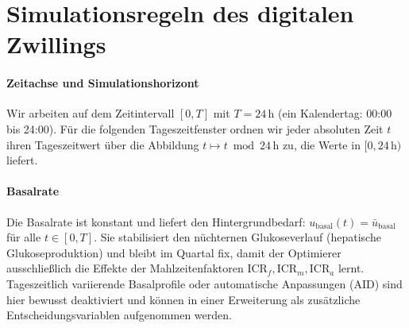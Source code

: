 \documentclass[ngerman,a4paper,12pt,pdftex]{article}
\newcommand{\ICR}{\mathrm{ICR}}
\begin{document}
\section{Simulationsregeln des digitalen Zwillings}

\paragraph{Zeitachse und Simulationshorizont} Wir arbeiten auf dem Zeitintervall \([0,T]\) mit \(T=24\,\mathrm{h}\) (ein Kalendertag: 00{:}00 bis 24{:}00). Für die folgenden Tageszeitfenster ordnen wir jeder absoluten Zeit \(t\) ihren Tageszeitwert über die Abbildung \(t \mapsto t \bmod 24\,\mathrm{h}\) zu, die Werte in \([0,24\,\mathrm{h})\) liefert.
\medskip
\newcommand{\ubasal}{\bar u_{\mathrm{basal}}}
\paragraph{Basalrate}
Die Basalrate ist konstant und liefert den Hintergrundbedarf: $u_{\mathrm{basal}}(t)=\ubasal$ für alle $t\in[0,T]$. Sie stabilisiert den nüchternen Glukoseverlauf (hepatische Glukoseproduktion) und bleibt im Quartal fix, damit der Optimierer ausschließlich die Effekte der Mahlzeitenfaktoren $\ICR_f,\ICR_m,\ICR_a$ lernt. Tageszeitlich variierende Basalprofile oder automatische Anpassungen (AID) sind hier bewusst deaktiviert und können in einer Erweiterung als zusätzliche Entscheidungsvariablen aufgenommen werden.

\newcommand{\tod}{\mathrm{tod}}
\medskip
\end{document}
